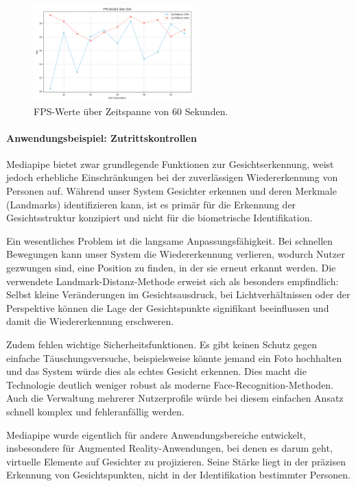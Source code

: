 \begin{figure}[ht]
    \centering
    \includegraphics[width=0.55\textwidth]{data/FPS_ueber_Zeit.png}
    \caption{FPS-Werte über Zeitspanne von 60 Sekunden.}
    \label{fig:fps_ueber_zeit}
\end{figure}

\paragraph{Anwendungsbeispiel: Zutrittskontrollen}

Mediapipe bietet zwar grundlegende Funktionen zur Gesichtserkennung, weist jedoch erhebliche Einschränkungen bei der zuverlässigen Wiedererkennung von Personen auf. 
Während unser System Gesichter erkennen und deren Merkmale (Landmarks) identifizieren kann, ist es primär für die Erkennung der Gesichtsstruktur konzipiert und nicht für die biometrische Identifikation.

Ein wesentliches Problem ist die langsame Anpassungsfähigkeit. Bei schnellen Bewegungen kann unser System die Wiedererkennung verlieren, wodurch Nutzer gezwungen sind, eine Position zu finden, in der sie erneut erkannt werden. 
Die verwendete Landmark-Distanz-Methode erweist sich als besonders empfindlich: Selbst kleine Veränderungen im Gesichtsausdruck, bei Lichtverhältnissen oder der Perspektive können die Lage der Gesichtspunkte signifikant beeinflussen und damit die Wiedererkennung erschweren.

Zudem fehlen wichtige Sicherheitsfunktionen. Es gibt keinen Schutz gegen einfache Täuschungsversuche, beispielsweise könnte jemand ein Foto hochhalten und das System würde dies als echtes Gesicht erkennen. 
Dies macht die Technologie deutlich weniger robust als moderne Face-Recognition-Methoden. Auch die Verwaltung mehrerer Nutzerprofile würde bei diesem einfachen Ansatz schnell komplex und fehleranfällig werden.

Mediapipe wurde eigentlich für andere Anwendungsbereiche entwickelt, insbesondere für Augmented Reality-Anwendungen, bei denen es darum geht, virtuelle Elemente auf Gesichter zu projizieren. 
Seine Stärke liegt in der präzisen Erkennung von Gesichtspunkten, nicht in der Identifikation bestimmter Personen.

